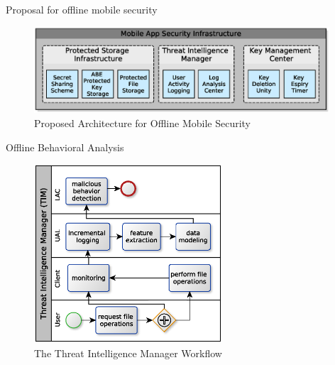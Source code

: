 \documentclass[newPxFont, numfooter, sectionpages]{beamer}
\begin{document}
	
	
\begin{frame}[c]{Proposal for offline mobile security}
	
	\begin{figure}[h!]
		\centering
		\includegraphics[width=11cm]{../figures/fig03.eps}
		\caption{Proposed Architecture for Offline Mobile Security}
		\label{fig:3_03}
	\end{figure}
	
\end{frame}
\begin{frame}[c]{Offline Behavioral Analysis}
	
	\begin{figure}[h!]
		\centering
		\includegraphics[width=7cm]{../figures/fig06.eps}
		\caption{The Threat Intelligence Manager Workflow}
		\label{fig:3_06}
	\end{figure}
	
\end{frame}
\end{document}
